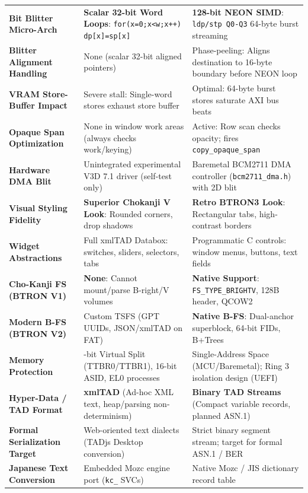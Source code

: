 \documentclass[10pt,journal,compsoc,twocolumn]{article}
\begin{document}
\begin{table}[t]
\begin{tabularx}{\textwidth}{@{} >{\raggedright\arraybackslash}p{3.8cm} >{\raggedright\arraybackslash}X >{\raggedright\arraybackslash}X @{}}
\textbf{Bit Blitter Micro-Arch} & \textbf{Scalar 32-bit Word Loops}: \texttt{for(x=0;x<w;x++) dp[x]=sp[x]} & \textbf{128-bit NEON SIMD}: \texttt{ldp/stp Q0-Q3} 64-byte burst streaming \\
\textbf{Blitter Alignment Handling} & None (scalar 32-bit aligned pointers) & Phase-peeling: Aligns destination to 16-byte boundary before NEON loop \\
\textbf{VRAM Store-Buffer Impact} & Severe stall: Single-word stores exhaust store buffer & Optimal: 64-byte burst stores saturate AXI bus beats \\
\textbf{Opaque Span Optimization} & None in window work areas (always checks work/keying) & Active: Row scan checks opacity; fires \texttt{copy\_opaque\_span} \\
\textbf{Hardware DMA Blit} & Unintegrated experimental V3D 7.1 driver (self-test only) & Baremetal BCM2711 DMA controller (\texttt{bcm2711\_dma.h}) with 2D blit \\
\textbf{Visual Styling Fidelity} & \textbf{Superior Chokanji V Look}: Rounded corners, drop shadows & \textbf{Retro BTRON3 Look}: Rectangular tabs, high-contrast borders \\
\textbf{Widget Abstractions} & Full xmlTAD Databox: switches, sliders, selectors, tabs & Programmatic C controls: window menus, buttons, text fields \\
\midrule
\textbf{Cho-Kanji FS (BTRON V1)} & \textbf{None}: Cannot mount/parse B-right/V volumes & \textbf{Native Support}: \texttt{FS\_TYPE\_BRIGHTV}, 128B header, QCOW2 \\
\textbf{Modern B-FS (BTRON V2)} & Custom TSFS (GPT UUIDs, JSON/xmlTAD on FAT) & \textbf{Native B-FS}: Dual-anchor superblock, 64-bit FIDs, B+Trees \\
\textbf{Memory Protection} & 48-bit Virtual Split (TTBR0/TTBR1), 16-bit ASID, EL0 processes & Single-Address Space (MCU/Baremetal); Ring 3 isolation design (UEFI) \\
\textbf{Hyper-Data / TAD Format} & \textbf{xmlTAD} (Ad-hoc XML text, heap/parsing non-determinism) & \textbf{Binary TAD Streams} (Compact variable records, planned ASN.1) \\
\textbf{Formal Serialization Target} & Web-oriented text dialects (TADjs Desktop conversion) & Strict binary segment stream; target for formal ASN.1 / BER \\
\textbf{Japanese Text Conversion} & Embedded Mozc engine port (\texttt{kc\_} SVCs) & Native Mozc / JIS dictionary record table \\
\bottomrule
\end{tabularx}
\end{table}
\end{document}
